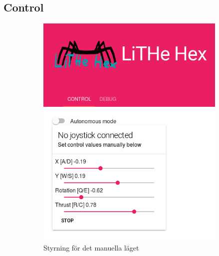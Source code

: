\documentclass[a4paper,titlepage,12pt]{article}
\begin{document}
	\subsection{Control}\label{gui:control}
	\begin{figure}[h]
      \centering
      \begin{subfigure}{.4\textwidth}
        \centering
		\includegraphics[width=1\linewidth]{images/gui-control.png}
        \caption{Styrning för det manuella läget}
      \end{subfigure}
      \begin{subfigure}{.4\textwidth}
        \centering

\end{subfigure}
\end{figure}
\end{document}

